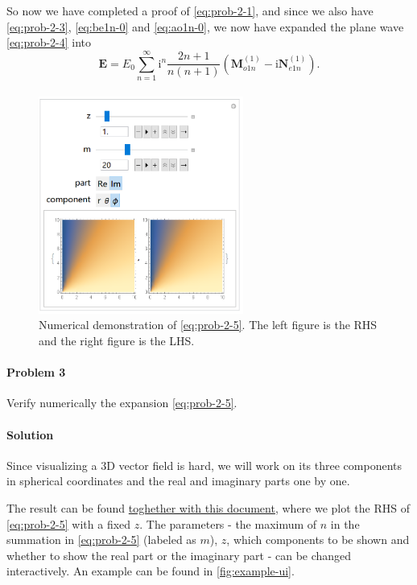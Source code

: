 \documentclass[hyperref, a4paper]{article}
\begin{document}
So now we have completed a proof of \eqref{eq:prob-2-1}, and since we also have \eqref{eq:prob-2-3}, \eqref{eq:be1n-0} and \eqref{eq:ao1n-0}, we now have expanded the plane wave \eqref{eq:prob-2-4} into 
\begin{equation}
    \boldsymbol{E}=E_{0} \sum_{n=1}^{\infty} \mathrm{i}^{n} \frac{2 n+1}{n(n+1)} \left( \boldsymbol{M}_{o 1 n}^{(1)}-\mathrm{i} \boldsymbol{N}_{e 1 n}^{(1)} \right).
    \label{eq:prob-2-5}
\end{equation}

\paragraph{}

\begin{figure}
    \centering
    \includegraphics[width = 0.6\textwidth]{example-ui.PNG}
    \caption{Numerical demonstration of \eqref{eq:prob-2-5}. The left figure is the RHS and the right figure is the LHS.}
    \label{fig:example-ui}
\end{figure}

\paragraph{Problem 3} Verify numerically the expansion \eqref{eq:prob-2-5}. 

\paragraph{Solution} Since visualizing a 3D vector field is hard, we will work on its three components in spherical coordinates and the real and imaginary parts one by one.

The result can be found \href{./homework-1-numerical.nb}{toghether with this document}, where we plot the RHS of \eqref{eq:prob-2-5} with a fixed $z$.
The parameters - the maximum of $n$ in the summation in \eqref{eq:prob-2-5} (labeled as $m$), $z$, which components to be shown and whether to show the real part or the imaginary part - can be changed interactively.
An example can be found in \eqref{fig:example-ui}.
\end{document}
